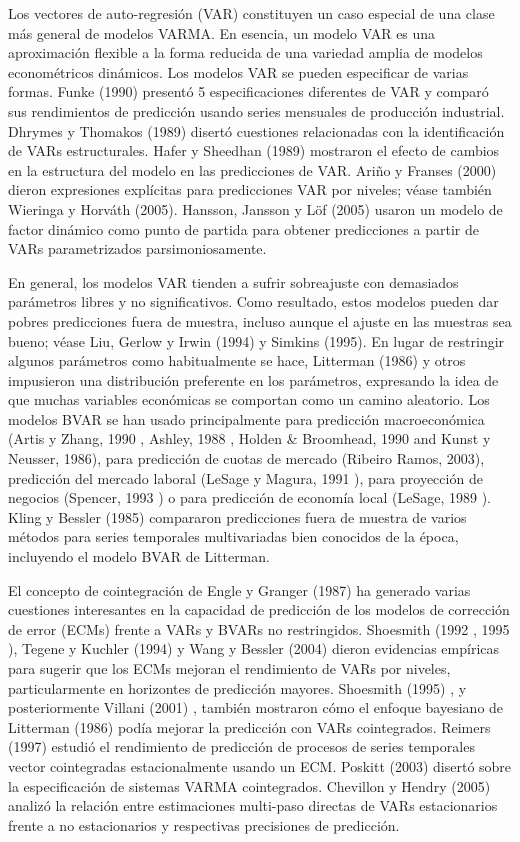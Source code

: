 \documentclass{llncs}
\begin{document}
Los vectores de auto-regresión (VAR) constituyen un caso especial de una clase más general de modelos VARMA. En esencia, un modelo VAR es una aproximación flexible a la forma reducida de una variedad amplia de modelos econométricos dinámicos. Los modelos VAR se pueden especificar de varias formas. Funke (1990) \cite{-} presentó 5 especificaciones diferentes de VAR y comparó sus rendimientos de predicción usando series mensuales de producción industrial. Dhrymes y Thomakos (1989) \cite{-} disertó cuestiones relacionadas con la identificación de VARs estructurales. Hafer y Sheedhan (1989) \cite{-} mostraron el efecto de cambios en la estructura del modelo en las predicciones de VAR. Ariño y Franses (2000) dieron expresiones explícitas para predicciones VAR por niveles; véase también Wieringa y Horváth (2005). Hansson, Jansson y Löf (2005) usaron un modelo de factor dinámico como punto de partida para obtener predicciones a partir de VARs parametrizados parsimoniosamente.

En general, los modelos VAR tienden a sufrir sobreajuste con demasiados parámetros libres y no significativos. Como resultado, estos modelos pueden dar pobres predicciones fuera de muestra, incluso aunque el ajuste en las muestras sea bueno; véase Liu, Gerlow y Irwin (1994) \cite{-} y Simkins (1995). En lugar de restringir algunos parámetros como habitualmente se hace, Litterman (1986) y otros impusieron una distribución preferente en los parámetros, expresando la idea de que muchas variables económicas se comportan como un camino aleatorio. Los modelos BVAR se han usado principalmente para predicción macroeconómica (Artis y Zhang, 1990 \cite{-}, Ashley, 1988 \cite{-}, Holden \& Broomhead, 1990 and Kunst y Neusser, 1986), para predicción de cuotas de mercado (Ribeiro Ramos, 2003), predicción del mercado laboral (LeSage y Magura, 1991 \cite{-}), para proyección de negocios (Spencer, 1993 \cite{-}) o para predicción de economía local (LeSage, 1989  \cite{-}). Kling y Bessler (1985) compararon predicciones fuera de muestra de varios métodos para series temporales multivariadas bien conocidos de la época, incluyendo el modelo BVAR de Litterman.

El concepto de cointegración de Engle y Granger (1987) \cite{-} ha generado varias cuestiones interesantes en la capacidad de predicción de los modelos de corrección de error (ECMs) frente a VARs y BVARs no restringidos. Shoesmith (1992 \cite{-}, 1995 \cite{-}), Tegene y Kuchler (1994) \cite{-} y Wang y Bessler (2004) \cite{-} dieron evidencias empíricas para sugerir que los ECMs mejoran el rendimiento de VARs por niveles, particularmente en horizontes de predicción mayores. Shoesmith (1995) \cite{-}, y posteriormente Villani (2001) \cite{-}, también mostraron cómo el enfoque bayesiano de Litterman (1986) \cite{-} podía mejorar la predicción con VARs cointegrados. Reimers (1997) \cite{-} estudió el rendimiento de predicción de procesos de series temporales vector cointegradas estacionalmente usando un ECM. Poskitt (2003) disertó sobre la especificación de sistemas VARMA cointegrados. Chevillon y Hendry (2005) analizó la relación entre estimaciones multi-paso directas de VARs estacionarios frente a no estacionarios y respectivas precisiones de predicción. 
\end{document}
